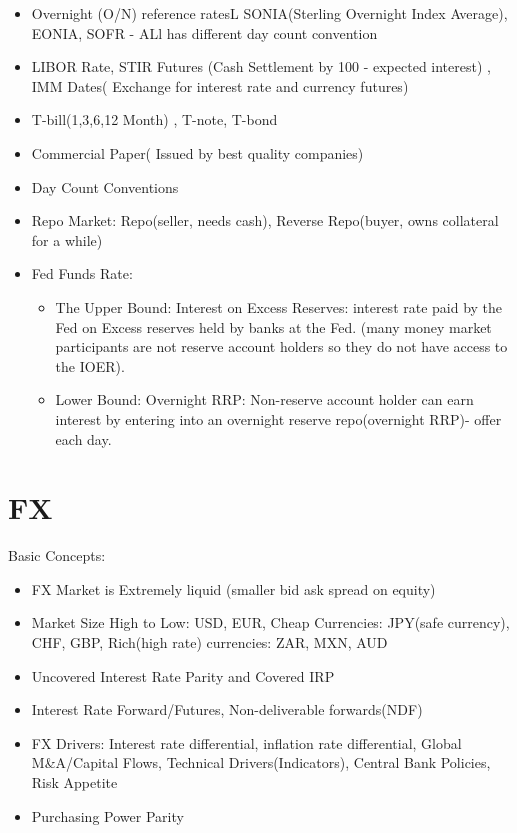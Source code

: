 \documentclass[11pt, openany]{book}              %
\begin{document}
\begin{itemize}
    \item Overnight (O/N) reference ratesL SONIA(Sterling Overnight Index Average), EONIA, SOFR - ALl has different day count convention
    \item LIBOR Rate, STIR Futures (Cash Settlement by 100 - expected interest) , IMM Dates( Exchange for interest rate and currency futures)
    \item T-bill(1,3,6,12 Month) , T-note, T-bond
    \item Commercial Paper( Issued by best quality companies)
    \item Day Count Conventions
    \item Repo Market: Repo(seller, needs cash), Reverse Repo(buyer, owns collateral for a while)
    \item Fed Funds Rate: 
    \begin{itemize}
    	\item The Upper Bound: Interest on Excess Reserves: interest rate paid by the Fed on Excess reserves held by banks at the Fed. (many money market participants are not reserve account holders so they do not have access to the IOER). 
    	\item Lower Bound: Overnight RRP: Non-reserve account holder can earn interest by entering into an overnight reserve repo(overnight RRP)- offer each day.
    \end{itemize}
\end{itemize}

\section{FX}

Basic Concepts:
\begin{itemize}
    \item FX Market is Extremely liquid (smaller bid ask spread on equity) 
    \item Market Size High to Low: USD, EUR, Cheap Currencies: JPY(safe currency), CHF, GBP, Rich(high rate) currencies: ZAR, MXN, AUD 
    \item Uncovered Interest Rate Parity and Covered IRP
    \item Interest Rate Forward/Futures, Non-deliverable forwards(NDF)
    \item FX Drivers: Interest rate differential, inflation rate differential, Global M\&A/Capital Flows, Technical Drivers(Indicators), Central Bank Policies, Risk Appetite
    \item Purchasing Power Parity
\end{itemize}
\end{document}
